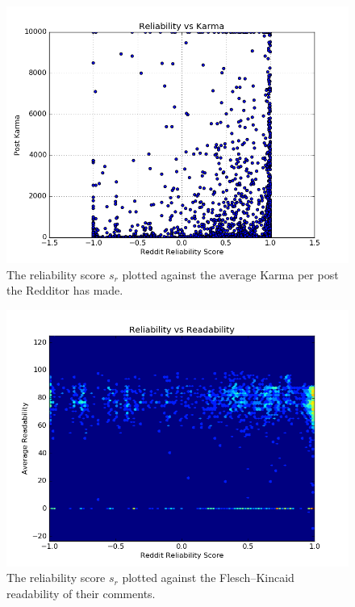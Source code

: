 \begin{figure}[tb]
    \centering
    \includegraphics[width=\linewidth]{figures/reliability_post_karma.png}
    \caption{The reliability score $s_r$ plotted against the average Karma per post the Redditor has made.}
    \label{fig:reliability_post_karma}
\end{figure}

\begin{figure}[tb]
    \centering
    \includegraphics[width=\linewidth]{figures/reliability_readability.png}
    \caption{The reliability score $s_r$ plotted against the Flesch--Kincaid readability of their comments.}
    \label{fig:reliability_readability}
\end{figure}

